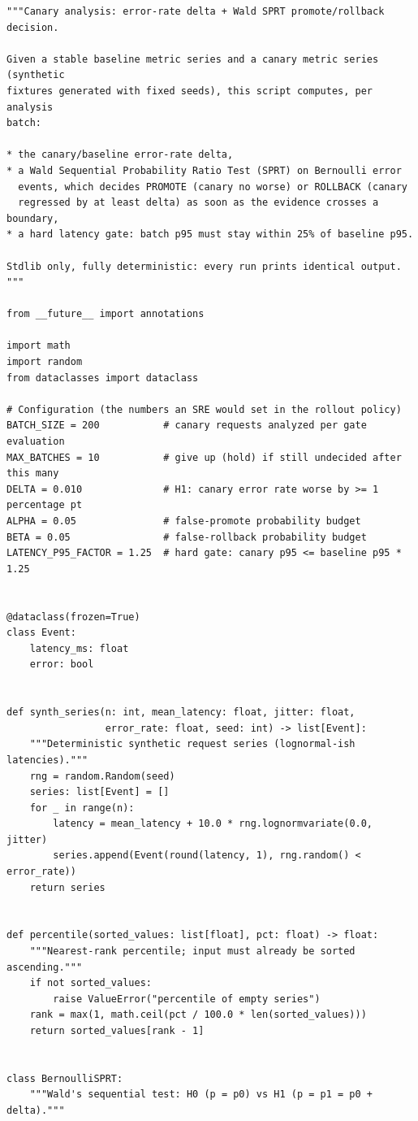 \begin{verbatim}
"""Canary analysis: error-rate delta + Wald SPRT promote/rollback decision.

Given a stable baseline metric series and a canary metric series (synthetic
fixtures generated with fixed seeds), this script computes, per analysis
batch:

* the canary/baseline error-rate delta,
* a Wald Sequential Probability Ratio Test (SPRT) on Bernoulli error
  events, which decides PROMOTE (canary no worse) or ROLLBACK (canary
  regressed by at least delta) as soon as the evidence crosses a boundary,
* a hard latency gate: batch p95 must stay within 25% of baseline p95.

Stdlib only, fully deterministic: every run prints identical output.
"""

from __future__ import annotations

import math
import random
from dataclasses import dataclass

# Configuration (the numbers an SRE would set in the rollout policy)
BATCH_SIZE = 200           # canary requests analyzed per gate evaluation
MAX_BATCHES = 10           # give up (hold) if still undecided after this many
DELTA = 0.010              # H1: canary error rate worse by >= 1 percentage pt
ALPHA = 0.05               # false-promote probability budget
BETA = 0.05                # false-rollback probability budget
LATENCY_P95_FACTOR = 1.25  # hard gate: canary p95 <= baseline p95 * 1.25


@dataclass(frozen=True)
class Event:
    latency_ms: float
    error: bool


def synth_series(n: int, mean_latency: float, jitter: float,
                 error_rate: float, seed: int) -> list[Event]:
    """Deterministic synthetic request series (lognormal-ish latencies)."""
    rng = random.Random(seed)
    series: list[Event] = []
    for _ in range(n):
        latency = mean_latency + 10.0 * rng.lognormvariate(0.0, jitter)
        series.append(Event(round(latency, 1), rng.random() < error_rate))
    return series


def percentile(sorted_values: list[float], pct: float) -> float:
    """Nearest-rank percentile; input must already be sorted ascending."""
    if not sorted_values:
        raise ValueError("percentile of empty series")
    rank = max(1, math.ceil(pct / 100.0 * len(sorted_values)))
    return sorted_values[rank - 1]


class BernoulliSPRT:
    """Wald's sequential test: H0 (p = p0) vs H1 (p = p1 = p0 + delta)."""


\end{verbatim}
